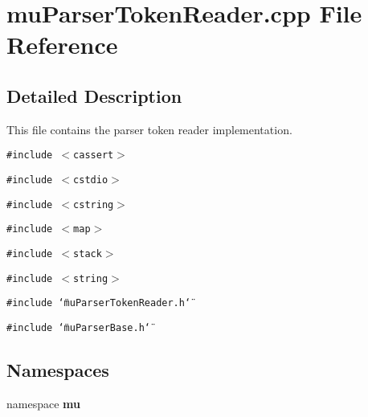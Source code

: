 \section{muParserTokenReader.cpp File Reference}
\label{muParserTokenReader_8cpp}


\subsection{Detailed Description}
This file contains the parser token reader implementation. 



{\tt \#include $<$cassert$>$}\par
{\tt \#include $<$cstdio$>$}\par
{\tt \#include $<$cstring$>$}\par
{\tt \#include $<$map$>$}\par
{\tt \#include $<$stack$>$}\par
{\tt \#include $<$string$>$}\par
{\tt \#include \char`\"{}muParserTokenReader.h\char`\"{}}\par
{\tt \#include \char`\"{}muParserBase.h\char`\"{}}\par
\subsection*{Namespaces}
\begin{CompactItemize}
\item 
namespace {\bf mu}
\end{CompactItemize}
